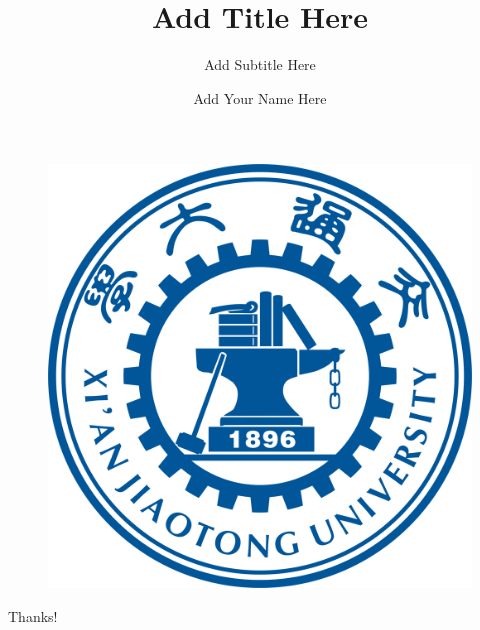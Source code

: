 \documentclass{beamer}
\author{Add Your Name Here}
\title{Add Title Here}
\subtitle{Add Subtitle Here}
\institute{Add Institute Here}
\date{\zhtoday}
\begin{document}
\kaishu
\begin{frame}
    \titlepage
    \begin{figure}[htpb]
        \begin{center}
            \includegraphics[width=0.2\linewidth]{pic/XJUT_Logo.png}
        \end{center}
    \end{figure}
\end{frame}

\begin{frame}
    \tableofcontents[sectionstyle=show,subsectionstyle=show/shaded/hide,subsubsectionstyle=show/shaded/hide]
\end{frame}

\begin{frame}
    \begin{center}
        {\Huge\calligra Thanks!}
    \end{center}
\end{frame}

%     
%     
\end{document}
